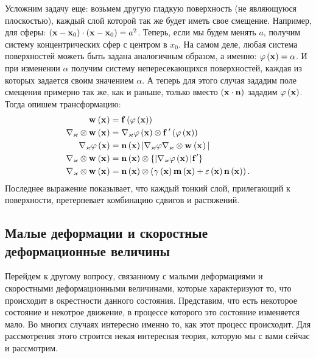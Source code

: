 \documentclass[a4papper, 14pt]{book}
\renewcommand{\epsilon}{\ensuremath{\varepsilon}}
\renewcommand{\phi}{\ensuremath{\varphi}}
\renewcommand{\kappa}{\ensuremath{\varkappa}}
\newcommand{\diad}{\ensuremath\otimes}
\newcommand{\wx}[3]{\ensuremath\mf{w}_{#3}\left({\mathbf{#1}}_{#2} \right)}
\newcommand{\lf}{\ensuremath \left(}
\newcommand{\ri}{\ensuremath \right)}
\newcommand{\mf}[1]{\ensuremath\mathbf{#1}}
\theoremstyle{plain} %
\theoremstyle{definition} %
\theoremstyle{remark} %
\begin{document}
	Усложним задачу еще: возьмем другую гладкую поверхность (не являющуюся плоскостью), каждый слой которой так же будет иметь свое смещение. Например, для сферы: $\lf\mf{x} - \mf{x}_0\ri\cdot\lf\mf{x} - \mf{x}_0\ri = a^2$. Теперь, если мы будем менять $a$, получим систему концентрических сфер с центром в $x_0$. На самом деле, любая система поверхностей можеть быть задана аналогичным образом, а именно: $\phi\lf\mf{x}\ri = \alpha$. И при изменении $\alpha$ получим систему непересекающихся поверхностей, каждая из которых задается своим значением $\alpha$. А теперь для этого случая зададим поле смещения примерно так же, как и раньше, только вместо $\lf \mf{x} \cdot \mf{n} \ri$ зададим $\phi \lf \mf{x} \ri$. Тогда опишем трансформацию:
	\begin{align}
	\wx{x}{}{} &= \mf{f} \lf \phi \lf \mf{x} \ri \ri \\ 
	\nabla_{\kappa} \diad \wx{x}{ }{ } &= \nabla_{\kappa} \phi \lf \mf{x} \ri \diad \mf{f} {\,^\prime} \lf \phi\lf \mf{x} \ri\ri \\
	\nabla_{\kappa} \phi\lf\mf{x}\ri &= \mf{n}\lf\mf{x}\ri\vert\nabla_{\kappa} \phi\nabla_{\kappa} \diad \wx{x}{ }{ } \vert \\
	\nabla_{\kappa} \diad \wx{x}{ }{ } &= \mf{n}\lf\mf{x}\ri\diad\{ \vert\nabla_{\kappa}\phi\lf\mf{x}\ri\vert\mf{f}{^\prime} \} \\
	\nabla_{\kappa} \diad \wx{x}{ }{ } &=\mf{n}\lf\mf{x}\ri\diad\lf \gamma\lf\mf{x}\ri\mf{m}\lf\mf{x}\ri + \epsilon\lf\mf{x}\ri\mf{n}\lf\mf{x}\ri \ri.\\
	\end{align}
	Последнее выражение показывает, что каждый тонкий слой, прилегающий к поверхности, претерпевает комбинацию сдвигов и растяжений. 	\subsection{Малые деформации и скоростные деформационные величины}
	Перейдем к другому вопросу, связанному с малыми деформациями и скоростными деформационными величинами, которые характеризуют то, что происходит в окрестности данного состояния. Представим, что есть некоторое состояние и некотрое движение, в процессе которого это состояние изменяется мало. Во многих случаях интересно именно то, как этот процесс происходит. Для рассмотрения этого строится некая интересная теория, которую мы с вами сейчас и рассмотрим. \\ 
	
\end{document}
